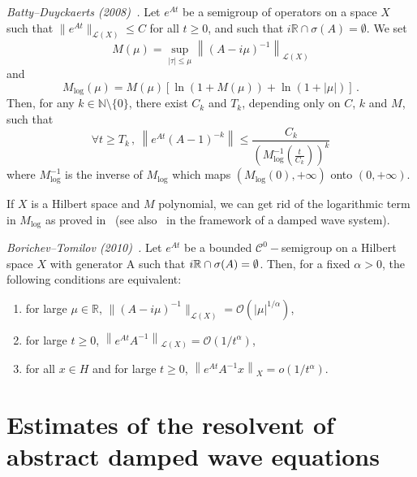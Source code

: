 \documentclass[AHL,Unicode,longabstracts]{cedram}
\newcommand{\RR}{\mathbb{R}}
\newcommand{\NN}{\mathbb{N}}
\newcommand{\Cc}{\mathcal{C}}
\newcommand{\Lc}{\mathcal{L}}
\newcommand{\Oc}{\mathcal{O}}
\newcommand*{\romanenumi}{\renewcommand*{\theenumi}{\roman{enumi}}}
\let\oldforall\forall
\renewcommand*{\forall}{\mathrel{\oldforall}}
\begin{document}
\begin{theo}\label{th-BD}
\emph{Batty--Duyckaerts (2008)~\cite[Theorem~1.5]{Batty-Duyckaerts}.}
Let $e^{At}$ be a semigroup of operators on a space $X$ such that $\|e^{At}\|_{\Lc(X)}\leq C$ for all $t\geq 0$, and such that $i\RR\cap
\sigma(A)=\emptyset$. We set
\[
M(\mu)=\sup_{|\tau|\leq \mu} \left\|(A-i\mu)^{-1}\right\|_{\Lc(X)}
\]
and
\[
M_{\log}(\mu)=M(\mu)[\ln(1+M(\mu))+\ln(1+|\mu|)]\,.
\]
Then, for any $k\in\NN\setminus\{0\}$, there exist $C_k$ and $T_k$, depending only on $C$, $k$ and $M$, such that
\[
\forall t\geq T_k\,,\:\left\|e^{At}(A-1)^{-k}\right\|\leq
\frac{C_k}{\left(M^{-1}_{\log}\left(\frac t{C_k}\right)\right)^k}
\]
where $M^{-1}_{\log}$ is the inverse of $M_{\log}$ which maps $(M_{\log}(0),+\infty)$ onto $(0,+\infty)$.
\end{theo}

If $X$ is a Hilbert space and $M$ polynomial, we can get rid of the logarithmic term in $M_{\log}$ as proved in~\cite{Bor-Tom} (see also~\cite{Ana-Leau} in the framework of a damped wave system).

\begin{theo}\label{th-BT}
\emph{Borichev--Tomilov (2010)~\cite[Theorem~2.4]{Bor-Tom}.}
Let $e^{At}$ be a bounded $\Cc^0-$semigroup on a Hilbert space $X$ with generator A such that $i\RR \cap \sigma(A)\linebreak=\emptyset$. Then, for a fixed $\alpha>0$, the following conditions are equivalent:
\begin{enumerate}\romanenumi
\item \label{listtheoA.4.1}for large $\mu\in\RR$, $\|(A-i\mu)^{-1}\|_{\Lc(X)} =
\Oc(|\mu|^{1/\alpha})$,
\item \label{listtheoA.4.2}for large $t\geq 0$, $\left\|e^{At}A^{-1}\right\|_{\Lc(X)} = \Oc(1/{t^{\alpha}})$,
\item \label{listtheoA.4.3}for all $x\in H$ and for large $t\geq 0$, $\left\|e^{At}A^{-1}x\right\|_{X} = o(1/{t^{\alpha}})$.
\end{enumerate}
\end{theo}


\section{Estimates of the resolvent of abstract damped wave equations}\label{section-appendix1}
\end{document}
